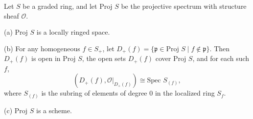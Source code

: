 Let $S$ be a graded ring, and let $\text{Proj } S$ be the projective spectrum with structure sheaf $\mathcal{O}$.

(a) $\text{Proj } S$ is a locally ringed space.

(b) For any homogeneous $f \in S_+$, let $D_+(f) = \{\mathfrak{p} \in \text{Proj } S \mid f \notin \mathfrak{p}\}$. Then $D_+(f)$ is open in $\text{Proj } S$, the open sets $D_+(f)$ cover $\text{Proj } S$, and for each such $f$,
$$\left(D_+(f), \mathcal{O}|_{D_+(f)}\right) \cong \text{Spec } S_{(f)},$$
where $S_{(f)}$ is the subring of elements of degree $0$ in the localized ring $S_f$.

(c) $\text{Proj } S$ is a scheme.
